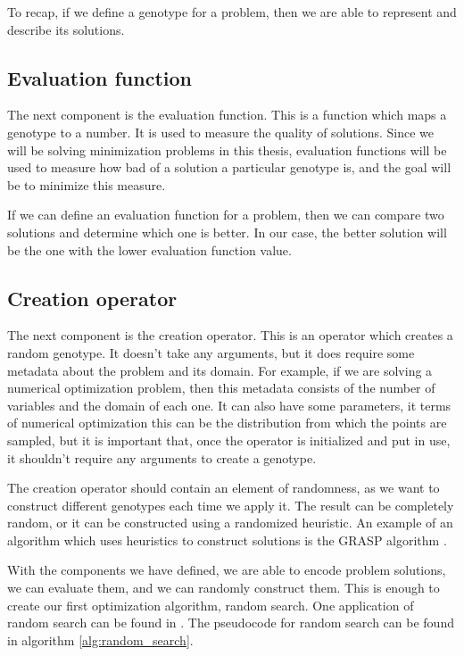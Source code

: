 To recap, if we define a genotype for a problem, then we are able to represent and describe its solutions.

\subsection{Evaluation function}
\label{sec:evaluation_function}

The next component is the evaluation function. This is a function which maps a genotype to a number. It is used to measure the quality of solutions. Since we will be solving minimization problems in this thesis, evaluation functions will be used to measure how bad of a solution a particular genotype is, and the goal will be to minimize this measure.

If we can define an evaluation function for a problem, then we can compare two solutions and determine which one is better. In our case, the better solution will be the one with the lower evaluation function value.

\subsection{Creation operator}
\label{sec:creation_operator}

The next component is the creation operator. This is an operator which creates a random genotype. It doesn't take any arguments, but it does require some metadata about the problem and its domain. For example, if we are solving a numerical optimization problem, then this metadata consists of the number of variables and the domain of each one. It can also have some parameters, it terms of numerical optimization this can be the distribution from which the points are sampled, but it is important that, once the operator is initialized and put in use, it shouldn't require any arguments to create a genotype.

The creation operator should contain an element of randomness, as we want to construct different genotypes each time we apply it. The result can be completely random, or it can be constructed using a randomized heuristic. An example of an algorithm which uses heuristics to construct solutions is the GRASP algorithm \citep{grasp}.

With the components we have defined, we are able to encode problem solutions, we can evaluate them, and we can randomly construct them. This is enough to create our first optimization algorithm, random search. One application of random search can be found in \citep{random_search}. The pseudocode for random search can be found in algorithm \ref{alg:random_search}.

